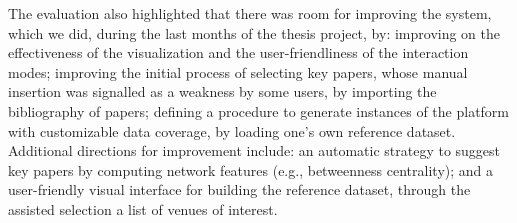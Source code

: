 The evaluation also highlighted that there was room for improving the system, which we did, during the last months of the thesis project, by: improving on the effectiveness of the visualization and the user-friendliness of the interaction modes; improving the initial process of selecting key papers, whose manual insertion was signalled as a weakness by some users, by importing the bibliography of papers; defining a procedure to generate instances of the platform with customizable data coverage, by loading one's own reference dataset. Additional directions for improvement include: an automatic strategy to suggest key papers by computing network features (e.g., betweenness  centrality); and a user-friendly visual interface for building the reference dataset, through the assisted selection a list of venues of interest.   


